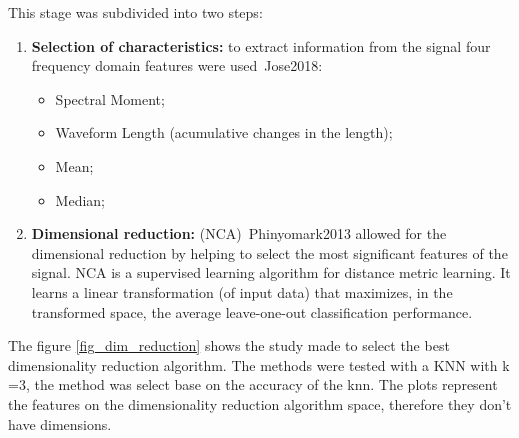 \documentclass[a4paper, 12pt]{ppgeb}
\begin{document}
This stage was subdivided into two steps:

\begin{enumerate}

    \item \textbf{Selection of characteristics:} to extract information from the signal four frequency domain features were used~\cite{mainreferences}{Jose2018}:
    \begin{itemize}
    	\item  Spectral Moment;
    	\item  Waveform Length (acumulative changes in the length);
    	\item  Mean;
    	\item  Median;
    \end{itemize}
    \item \textbf{Dimensional reduction:} (\ac{NCA})~\cite{mainreferences}{Phinyomark2013} allowed for the dimensional reduction by helping to select the most significant features of the signal. \ac{NCA} is a supervised learning algorithm for distance metric learning. It learns a linear transformation (of input data) that maximizes, in the transformed space, the average leave-one-out classification performance.
\end{enumerate}

The figure \ref{fig_dim_reduction} shows the study made to select the best dimensionality reduction algorithm. The methods were tested with a \ac{KNN} with k =3, the method was select base on the accuracy of the knn. The plots represent the features on the dimensionality reduction algorithm space, therefore they don't have dimensions.
\end{document}
